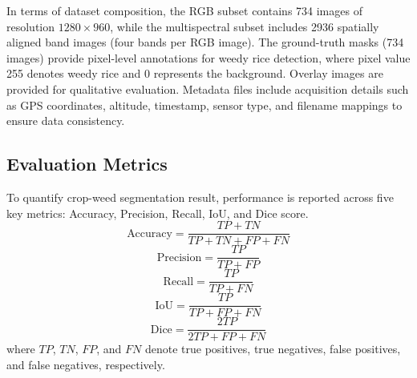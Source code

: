 \documentclass[pdflatex,sn-mathphys-num]{sn-jnl}
\begin{document}
In terms of dataset composition, the RGB subset contains 734 images of resolution $1280 \times 960$, while the multispectral subset includes 2936 spatially aligned band images (four bands per RGB image). The ground-truth masks (734 images) provide pixel-level annotations for weedy rice detection, where pixel value 255 denotes weedy rice and 0 represents the background. Overlay images are provided for qualitative evaluation. Metadata files include acquisition details such as GPS coordinates, altitude, timestamp, sensor type, and filename mappings to ensure data consistency. 




\subsection{Evaluation Metrics}
\label{evaluation_metrics}

To quantify crop-weed segmentation result, performance is reported across five key metrics: Accuracy, Precision, Recall, IoU, and Dice score.
\begin{equation}
\text{Accuracy} = \frac{TP + TN}{TP + TN + FP + FN}
\label{eq:accuracy}
\end{equation}
\begin{equation}
\text{Precision} = \frac{TP}{TP + FP}
\label{eq:precision}
\end{equation}
\begin{equation}
\text{Recall} = \frac{TP}{TP + FN}
\label{eq:recall}
\end{equation}
\begin{equation}
\text{IoU} = \frac{TP}{TP + FP + FN}
\label{eq:iou}
\end{equation}
\begin{equation}
\text{Dice} = \frac{2TP}{2TP + FP + FN}
\label{eq:dice_metric}
\end{equation}
where $TP$, $TN$, $FP$, and $FN$ denote true positives, true negatives, false positives, and false negatives, respectively.
\end{document}
